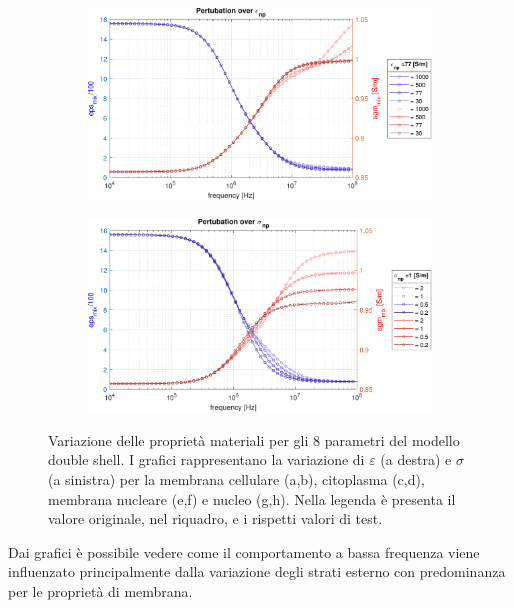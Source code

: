 \begin{figure}[t!]
\begin{subfigure}{0.5\linewidth}
	\caption{}
	\label{fig:sgmnepert}
\end{subfigure}\vspace{0.6cm}
	\begin{subfigure}{0.5\linewidth}
	\centering
	\includegraphics[width=0.95\linewidth]{../code/figs/eps_np_pert}
	\caption{}
	\label{fig:epsnppert}
\end{subfigure}\hfill
\begin{subfigure}{0.5\linewidth}
	\centering
	\includegraphics[width=0.95\linewidth]{../code/figs/sgm_np_pert}
	\caption{}
	\label{fig:sgmnppert}
\end{subfigure}\hfill
	\caption{Variazione delle proprietà materiali per gli 8 parametri del modello double shell. I grafici rappresentano la variazione di $\varepsilon$ (a destra) e $\sigma$ (a sinistra) per la membrana cellulare (a,b), citoplasma (c,d), membrana nucleare (e,f) e nucleo (g,h). Nella legenda è presenta il valore originale, nel riquadro, e i rispetti valori di test.}
	\label{fig:perturbazioni}
\end{figure}

Dai grafici è possibile vedere come il comportamento a bassa frequenza viene influenzato principalmente dalla variazione degli strati esterno con predominanza per le proprietà di membrana.

